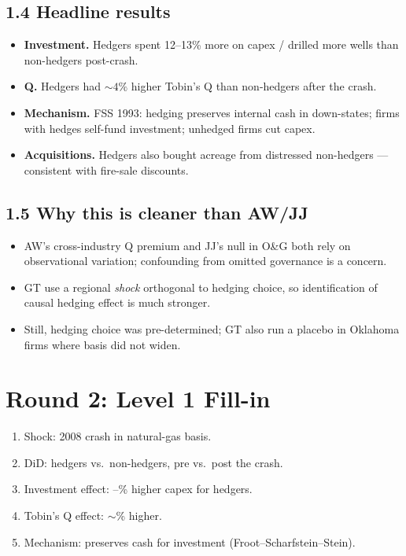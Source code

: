 \documentclass[11pt]{article}
\newcommand{\blank}[1]{\underline{\hspace{#1}}}
\begin{document}
\subsection*{1.4 Headline results}
\begin{itemize}
\item \textbf{Investment.} Hedgers spent 12--13\% more on capex / drilled more wells than non-hedgers post-crash.
\item \textbf{Q.} Hedgers had $\sim 4\%$ higher Tobin's Q than non-hedgers after the crash.
\item \textbf{Mechanism.} FSS 1993: hedging preserves internal cash in down-states; firms with hedges self-fund investment; unhedged firms cut capex.
\item \textbf{Acquisitions.} Hedgers also bought acreage from distressed non-hedgers --- consistent with fire-sale discounts.
\end{itemize}

\subsection*{1.5 Why this is cleaner than AW/JJ}
\begin{alertbox}
\begin{itemize}
\item AW's cross-industry Q premium and JJ's null in O\&G both rely on observational variation; confounding from omitted governance is a concern.
\item GT use a regional \emph{shock} orthogonal to hedging choice, so identification of causal hedging effect is much stronger.
\item Still, hedging choice was pre-determined; GT also run a placebo in Oklahoma firms where basis did not widen.
\end{itemize}
\end{alertbox}

\section*{Round 2: Level 1 Fill-in}
\begin{enumerate}
\item Shock: 2008 crash in \blank{2cm} natural-gas basis.
\item DiD: hedgers vs.\ non-hedgers, pre vs.\ post the crash.
\item Investment effect: \blank{1cm}--\blank{1cm}\% higher capex for hedgers.
\item Tobin's Q effect: $\sim$\blank{1cm}\% higher.
\item Mechanism: preserves \blank{2cm} cash for investment (Froot--Scharfstein--Stein).
\end{enumerate}
\end{document}
